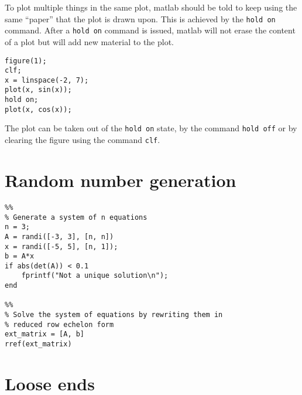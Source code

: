 \documentclass[fleqn, 12pt,a4paper]{article}
\newcounter{ex}
\numberwithin{ex}{section}
\begin{document}
To plot multiple things in the same plot, matlab should be told
to keep using the same ``paper'' that the plot is drawn upon.
This is achieved by the \verb!hold on! command.
After a \verb!hold on! command is issued, matlab will not erase 
the content of a plot but will add new material to the plot.

\begin{lstlisting}
figure(1);
clf; 
x = linspace(-2, 7);
plot(x, sin(x));
hold on;
plot(x, cos(x));
\end{lstlisting}

The plot can be taken out of the \verb!hold on! state, by the 
command \verb!hold off! or by clearing the figure using the 
command \verb!clf!.







\section{Random number generation}


\begin{lstlisting}
%%
% Generate a system of n equations
n = 3;
A = randi([-3, 3], [n, n])
x = randi([-5, 5], [n, 1]);
b = A*x
if abs(det(A)) < 0.1
    fprintf("Not a unique solution\n");
end

%%
% Solve the system of equations by rewriting them in 
% reduced row echelon form
ext_matrix = [A, b]
rref(ext_matrix)
\end{lstlisting}


\section{Loose ends}





\end{document}
